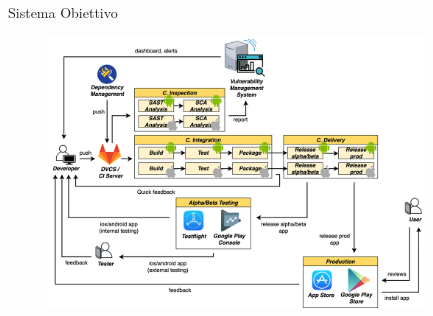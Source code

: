 \begin{frame}{Sistema Obiettivo}
    \begin{figure}[H]
        \includegraphics[width=0.89\textwidth]{img/full-cicd.png}
    \end{figure}
\end{frame}

